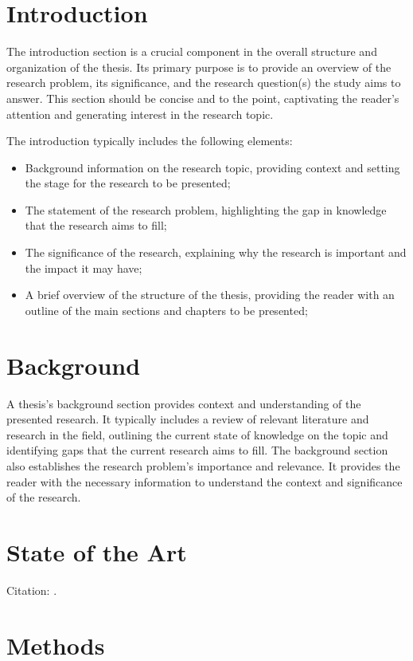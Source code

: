 \documentclass[11pt]{report} %
\begin{document}
\chapter{Introduction}
The introduction section is a crucial component in the overall structure and organization of the thesis.
Its primary purpose is to provide an overview of the research problem, its significance, and the research question(s) the study aims to answer. This section should be concise and to the point, captivating the reader's attention and generating interest in the research topic.

The introduction typically includes the following elements:
\begin{itemize}
    \item Background information on the research topic, providing context and setting the stage for the research to be presented;
    \item The statement of the research problem, highlighting the gap in knowledge that the research aims to fill;
    \item The significance of the research, explaining why the research is important and the impact it may have;
    \item A brief overview of the structure of the thesis, providing the reader with an outline of the main sections and chapters to be presented;
\end{itemize}



\chapter{Background}
A thesis's background section provides context and understanding of the presented research. It typically includes a review of relevant literature and research in the field, outlining the current state of knowledge on the topic and identifying gaps that the current research aims to fill. The background section also establishes the research problem's importance and relevance. It provides the reader with the necessary information to understand the context and significance of the research.


\chapter{State of the Art}
Citation: \cite{guidotti2018survey}.

\chapter{Methods}
\end{document}
